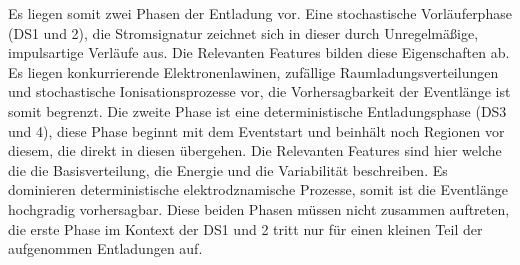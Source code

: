 Es liegen somit zwei Phasen der Entladung vor. Eine stochastische Vorläuferphase (DS1 und 2), die Stromsignatur zeichnet sich in dieser durch Unregelmäßige, impulsartige Verläufe aus. Die Relevanten Features bilden diese Eigenschaften ab. Es liegen konkurrierende Elektronenlawinen, zufällige Raumladungsverteilungen und stochastische Ionisationsprozesse vor, die Vorhersagbarkeit der Eventlänge ist somit begrenzt.
Die zweite Phase ist eine deterministische Entladungsphase (DS3 und 4), diese Phase beginnt mit dem Eventstart und beinhält noch Regionen vor diesem, die direkt in diesen übergehen. Die Relevanten Features sind hier welche die die Basisverteilung, die Energie und die Variabilität beschreiben. Es dominieren deterministische elektrodznamische Prozesse, somit ist die Eventlänge hochgradig vorhersagbar. 
Diese beiden Phasen müssen nicht zusammen auftreten, die erste Phase im Kontext der DS1 und 2 tritt nur für einen kleinen Teil der aufgenommen Entladungen auf. 

